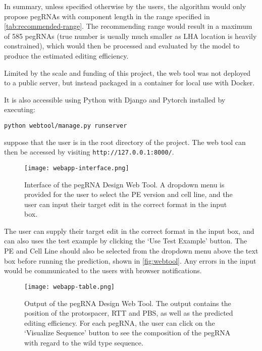 In summary, unless specified otherwise by the users, the algorithm would only propose pegRNAs with component length in the range specified in \autoref{tab:recommended-range}. The recommending range would result in a maximum of 585 pegRNAs (true number is usually much smaller as LHA location is heavily constrained), which would then be processed and evaluated by the model to produce the estimated editing efficiency.




Limited by the scale and funding of this project, the web tool was not deployed to a public server, but instead packaged in a container for local use with Docker. 

It is also accessible using Python with Django and Pytorch installed by executing:

\verb|python webtool/manage.py runserver|

suppose that the user is in the root directory of the project. The web tool can then be accessed by visiting \verb|http://127.0.0.1:8000/|.

\begin{figure}
    \centering
    \texttt{[image: webapp-interface.png]}
    \caption[pegRNA Design Web Tool Interface]{Interface of the pegRNA Design Web Tool. A dropdown menu is provided for the user to select the PE version and cell line, and the user can input their target edit in the correct format in the input box.}
    \label{fig:webtool}
\end{figure}

The user can supply their target edit in the correct format in the input box, and can also uses the test example by clicking the `Use Test Example' button. The PE and Cell Line should also be selected from the dropdown menu above the text box before running the prediction, shown in \autoref{fig:webtool}. Any errors in the input would be communicated to the users with browser notifications. 

\begin{figure}
    \centering
    \texttt{[image: webapp-table.png]}
    \caption[pegRNA Design Web Tool Output]{Output of the pegRNA Design Web Tool. The output contains the position of the protospacer, RTT and PBS, as well as the predicted editing efficiency. For each pegRNA, the user can click on the `Visualize Sequence' button to see the composition of the pegRNA with regard to the wild type sequence.}
    \label{fig:webtool-output}
\end{figure}

